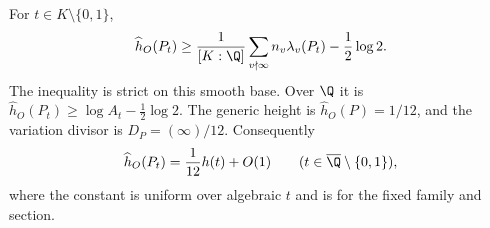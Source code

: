 \begin{proposition}\label{ari:C.6.4}
For $t\in K\setminus\{0,1\}$,
\begin{equation}\label{ari:eq:ch-bound}
 \widehat h_O(P_t)\geq
 \frac1{[K:\Q]}\sum_{v\nmid\infty}n_v\lambda_v(P_t)
                    -\frac12\log2.
\end{equation}
The inequality is strict on this smooth base. Over $\Q$ it
is $\widehat h_O(P_t)\geq\log A_t-\frac12\log2$.
The generic height is $\widehat h_O(P)=1/12$, and the
variation divisor is $D_P=(\infty)/12$. Consequently
\[
 \widehat h_O(P_t)=\frac1{12}h(t)+O(1)
 \qquad(t\in\overline\Q\setminus\{0,1\}),
\]
where the constant is uniform over algebraic $t$ and is for
the fixed family and section.
\end{proposition}

